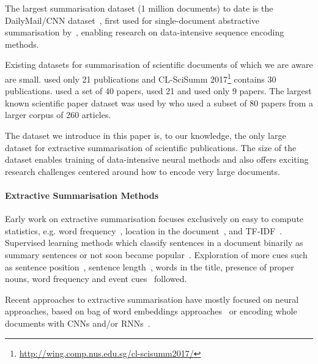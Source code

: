 \documentclass[11pt,a4paper]{article}
\begin{document}
The largest summarisation dataset (1 million documents) to date is the DailyMail/CNN dataset~\cite{hermann2015teaching}, first used for single-document abstractive summarisation by~\cite{nallapati2016abstractive}, enabling research on data-intensive sequence encoding methods.


Existing datasets for summarisation of scientific documents of which we are aware are small.  used only 21 publications and CL-SciSumm 2017\footnote{\url{http://wing.comp.nus.edu.sg/cl-scisumm2017/}} contains 30 publications.  used a set of 40 papers,  used 21 and  used only 9 papers. The largest known scientific paper dataset was used by  who used a subset of 80 papers from a larger corpus of 260 articles.

The dataset we introduce in this paper is, to our knowledge, the only large dataset for extractive summarisation of scientific publications. The size of the dataset enables training of data-intensive neural methods and also offers exciting research challenges centered around how to encode very large documents.


\paragraph{Extractive Summarisation Methods}
Early work on extractive summarisation focuses exclusively on easy to compute statistics, e.g. word frequency~\cite{luhn1958automatic}, location in the document~\cite{baxendale1958machine}, and TF-IDF~\cite{salton1996automatic}.
Supervised learning methods which classify sentences in a document binarily as summary sentences or not soon became popular~\cite{kupiec1995trainable}. Exploration of more cues such as sentence position~\cite{yang-bao-nenkova:2017:EACLshort}, sentence length~\cite{radev2004mead}, words in the title, presence of proper nouns, word frequency \cite{nenkova2006compositional} and event cues~\cite{filatova2004event} followed.

Recent approaches to extractive summarisation have mostly focused on neural approaches, based on bag of word embeddings approaches~\cite{kobayashi2015summarization,yogatama2015extractive} or encoding whole documents with CNNs and/or RNNs~\cite{cheng-lapata:2016:P16-1}. 
\end{document}

